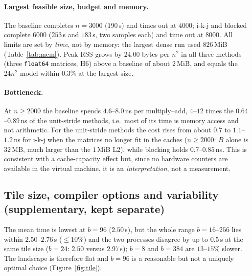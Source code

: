 \paragraph{Largest feasible size, budget and memory.}
\begin{table}[H]
\centering\scriptsize
\resizebox{\textwidth}{!}{}
\caption{Largest feasible and largest attempted size under the budgets (300\,s per sample, 4\,GiB). \emph{Not attempted}: skipped after an earlier timeout of the same series.}
\label{tab:limits}
\end{table}
The baseline completes $n=3000$ ($190$\,s) and times out at $4000$; i-k-j and blocked complete $6000$ ($253$\,s and $183$\,s, two samples each) and time out at $8000$.
All limits are set by \emph{time}, not by memory: the largest dense run used $826$\,MiB (Table~\ref{tab:mem}). Peak RSS grows by $24.00$ bytes per $n^2$ in all three methods (three \texttt{float64} matrices, H6)
above a baseline of about $2$\,MiB, and equals the $24n^2$ model within $0.3\%$ at the largest size.

\begin{table}[H]
\centering\scriptsize
\resizebox{\textwidth}{!}{}
\caption{Peak resident memory of the dense methods (\texttt{VmHWM}) and the model $24n^2$ bytes.}
\label{tab:mem}
\end{table}

\paragraph{Bottleneck.} At $n\ge2000$ the baseline spends $4.6$--$8.0$\,ns per multiply--add, $4$--$12$ times the $0.64$--$0.89$\,ns of the unit-stride methods, i.e.\ most of its time is memory access and not arithmetic.
For the unit-stride methods the cost rises from about $0.7$ to $1.1$--$1.2$\,ns for i-k-j when the matrices no longer fit in the caches ($n\ge2000$: $B$ alone is $32$\,MB, much larger than the $1$\,MiB L2), while blocking holds $0.7$--$0.85$\,ns. This is consistent with a cache-capacity effect but, since no hardware counters
are available in the virtual machine, it is an \emph{interpretation}, not a measurement.

\subsection{Tile size, compiler options and variability (supplementary, kept separate)}
\label{sec:resbs}
\begin{table}[H]
\centering\small

\caption{Tile-size sweep of the blocked method at $n=1500$ (seconds, median of two independent processes and their mean). Best tile in bold.}
\label{tab:bs}
\end{table}
The mean time is lowest at $b=96$ ($2.50$\,s), but the whole range $b=16$--$256$ lies within $2.50$--$2.76$\,s ($\le10\%$) and the two processes disagree by up to $0.5$\,s at the same tile size ($b=24$: $2.50$ versus $2.97$\,s); $b=8$ and $b=384$ are $13$--$15\%$ slower.
The landscape is therefore flat and $b=96$ is a reasonable but not a uniquely optimal choice (Figure~\ref{fig:tile}).

